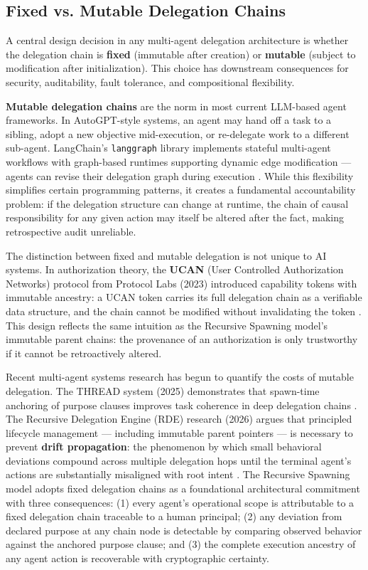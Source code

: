 \subsection{Fixed vs. Mutable Delegation Chains}
\label{sec:delegation}

A central design decision in any multi-agent delegation architecture is whether the delegation chain is \textbf{fixed} (immutable after creation) or \textbf{mutable} (subject to modification after initialization). This choice has downstream consequences for security, auditability, fault tolerance, and compositional flexibility.

\textbf{Mutable delegation chains} are the norm in most current LLM-based agent frameworks. In AutoGPT-style systems, an agent may hand off a task to a sibling, adopt a new objective mid-execution, or re-delegate work to a different sub-agent. LangChain's \texttt{langgraph} library implements stateful multi-agent workflows with graph-based runtimes supporting dynamic edge modification — agents can revise their delegation graph during execution \cite{heavybit2025multiagent}. While this flexibility simplifies certain programming patterns, it creates a fundamental accountability problem: if the delegation structure can change at runtime, the chain of causal responsibility for any given action may itself be altered after the fact, making retrospective audit unreliable.

The distinction between fixed and mutable delegation is not unique to AI systems. In authorization theory, the \textbf{UCAN} (User Controlled Authorization Networks) protocol from Protocol Labs (2023) introduced capability tokens with immutable ancestry: a UCAN token carries its full delegation chain as a verifiable data structure, and the chain cannot be modified without invalidating the token \cite{UCAN}. This design reflects the same intuition as the Recursive Spawning model's immutable parent chains: the provenance of an authorization is only trustworthy if it cannot be retroactively altered.

Recent multi-agent systems research has begun to quantify the costs of mutable delegation. The THREAD system (2025) demonstrates that spawn-time anchoring of purpose clauses improves task coherence in deep delegation chains \cite{thread2025}. The Recursive Delegation Engine (RDE) research (2026) argues that principled lifecycle management — including immutable parent pointers — is necessary to prevent \textbf{drift propagation}: the phenomenon by which small behavioral deviations compound across multiple delegation hops until the terminal agent's actions are substantially misaligned with root intent \cite{rde2026}. The Recursive Spawning model adopts fixed delegation chains as a foundational architectural commitment with three consequences: (1) every agent's operational scope is attributable to a fixed delegation chain traceable to a human principal; (2) any deviation from declared purpose at any chain node is detectable by comparing observed behavior against the anchored purpose clause; and (3) the complete execution ancestry of any agent action is recoverable with cryptographic certainty.

